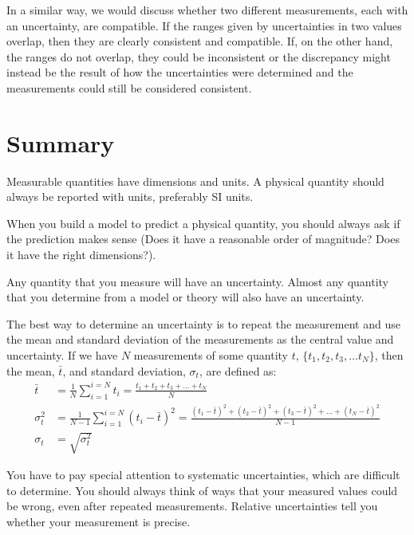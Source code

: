 In a similar way, we would discuss whether two different measurements, each with an uncertainty, are compatible. If the ranges given by uncertainties in two values overlap, then they are clearly consistent and compatible. If, on the other hand, the ranges do not overlap, they could be inconsistent or the discrepancy might instead be the result of how the uncertainties were determined and the measurements could still be considered consistent. 

\newpage
\section{Summary}
\vspace{0.5cm}
%
\begin{chapterSummary}
Measurable quantities have dimensions and units. A physical quantity should always be reported with units, preferably SI units.

When you build a model to predict a physical quantity, you should always ask if the prediction makes sense (Does it have a reasonable order of magnitude? Does it have the right dimensions?).

Any quantity that you measure will have an uncertainty. Almost any quantity that you determine from a model or theory will also have an uncertainty.

The best way to determine an uncertainty is to repeat the measurement and use the mean and standard deviation of the measurements as the central value and uncertainty. 
If we have $N$ measurements of some quantity $t$, $\{t_1, t_2, t_3, \dots t_N\}$, then the mean, $\bar t$, and standard deviation, $\sigma_t$, are defined as:
\begin{align*}
\bar t &= \frac{1}{N}\sum_{i=1}^{i=N} t_i=\frac{t_1 +t_2 +t_3 +\dots+ t_N}{N} \\
\sigma_t^2 &=\frac{1}{N-1}\sum_{i=1}^{i=N}(t_i-\bar t)^2 = \frac{(t_1-\bar t)^2+(t_2-\bar t)^2+(t_3-\bar t)^2+\dots+(t_N-\bar t)^2}{N-1} \\
\sigma_t &=\sqrt{\sigma_t^2}
\end{align*}

You have to pay special attention to systematic uncertainties, which are difficult to determine. You should always think of ways that your measured values could be wrong, even after repeated measurements. Relative uncertainties tell you whether your measurement is precise.


\end{chapterSummary}
